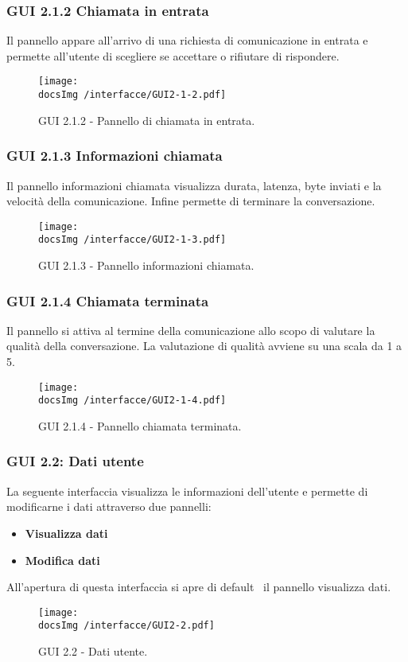 \subsubsection{GUI 2.1.2 Chiamata in entrata}
Il pannello appare all’arrivo di una richiesta di comunicazione in entrata e permette all’utente di scegliere se accettare o rifiutare di rispondere.
\begin{figure}[htbp]
\centering
\texttt{[image: \\docsImg /interfacce/GUI2-1-2.pdf]}
\caption{GUI 2.1.2 - Pannello di chiamata in entrata.}
\end{figure}

\subsubsection{GUI 2.1.3 Informazioni chiamata}
Il pannello informazioni chiamata visualizza durata, latenza, byte inviati e la velocità della comunicazione. Infine permette di terminare la conversazione.
\begin{figure}[htbp]
\centering
\texttt{[image: \\docsImg /interfacce/GUI2-1-3.pdf]}
\caption{GUI 2.1.3 - Pannello informazioni chiamata.}
\end{figure}

\subsubsection{GUI 2.1.4 Chiamata terminata}
Il pannello si attiva al termine della comunicazione allo scopo di valutare la qualità della conversazione. La valutazione di qualità avviene su una scala da 1 a 5.
\begin{figure}[htbp]
\centering
\texttt{[image: \\docsImg /interfacce/GUI2-1-4.pdf]}
\caption{GUI 2.1.4 - Pannello chiamata terminata.}
\end{figure}

\subsubsection{GUI 2.2: Dati utente}
La seguente interfaccia visualizza le informazioni dell’utente e permette di modificarne i dati attraverso due pannelli:
\begin{itemize}
\item \textbf{Visualizza dati}
\item \textbf{Modifica dati}
\end{itemize}
All’apertura di questa interfaccia si apre di default\g~ il pannello visualizza dati.
\begin{figure}[htbp]
\centering
\texttt{[image: \\docsImg /interfacce/GUI2-2.pdf]}
\caption{GUI 2.2 - Dati utente.}
\end{figure}

